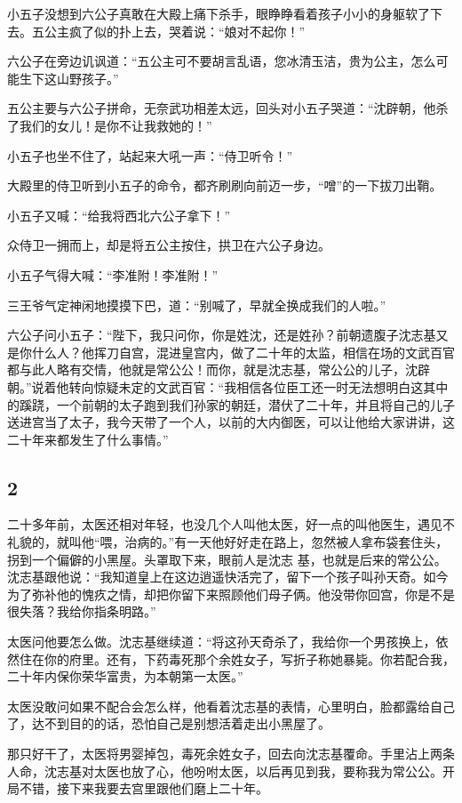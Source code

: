 小五子没想到六公子真敢在大殿上痛下杀手，眼睁睁看着孩子小小的身躯软了下去。五公主疯了似的扑上去，哭着说：“娘对不起你！”

六公子在旁边讥讽道：“五公主可不要胡言乱语，您冰清玉洁，贵为公主，怎么可能生下这山野孩子。”

五公主要与六公子拼命，无奈武功相差太远，回头对小五子哭道：“沈辟朝，他杀了我们的女儿！是你不让我救她的！”

小五子也坐不住了，站起来大吼一声：“侍卫听令！”

大殿里的侍卫听到小五子的命令，都齐刷刷向前迈一步，“噌”的一下拔刀出鞘。

小五子又喊：“给我将西北六公子拿下！”

众侍卫一拥而上，却是将五公主按住，拱卫在六公子身边。

小五子气得大喊：“李准附！李准附！”

三王爷气定神闲地摸摸下巴，道：“别喊了，早就全换成我们的人啦。”

六公子问小五子：“陛下，我只问你，你是姓沈，还是姓孙？前朝遗腹子沈志基又是你什么人？他挥刀自宫，混进皇宫内，做了二十年的太监，相信在场的文武百官都与此人略有交情，他就是常公公！而你，就是沈志基，常公公的儿子，沈辟朝。”说着他转向惊疑未定的文武百官：“我相信各位臣工还一时无法想明白这其中的蹊跷，一个前朝的太子跑到我们孙家的朝廷，潜伏了二十年，并且将自己的儿子送进宫当了太子，我今天带了一个人，以前的大内御医，可以让他给大家讲讲，这二十年来都发生了什么事情。”
\newline

{\centering\subsection{2}}

二十多年前，太医还相对年轻，也没几个人叫他太医，好一点的叫他医生，遇见不礼貌的，就叫他“喂，治病的。”有一天他好好走在路上，忽然被人拿布袋套住头，拐到一个偏僻的小黑屋。头罩取下来，眼前人是沈志
基，也就是后来的常公公。沈志基跟他说：“我知道皇上在这边逍遥快活完了，留下一个孩子叫孙天奇。如今为了弥补他的愧疚之情，却把你留下来照顾他们母子俩。他没带你回宫，你是不是很失落？我给你指条明路。”

太医问他要怎么做。沈志基继续道：“将这孙天奇杀了，我给你一个男孩换上，依然住在你的府里。还有，下药毒死那个余姓女子，写折子称她暴毙。你若配合我，二十年内保你荣华富贵，为本朝第一太医。”

太医没敢问如果不配合会怎么样，他看着沈志基的表情，心里明白，脸都露给自己了，达不到目的的话，恐怕自己是别想活着走出小黑屋了。

那只好干了，太医将男婴掉包，毒死余姓女子，回去向沈志基覆命。手里沾上两条人命，沈志基对太医也放了心，他吩咐太医，以后再见到我，要称我为常公公。开局不错，接下来我要去宫里跟他们磨上二十年。
\newline

